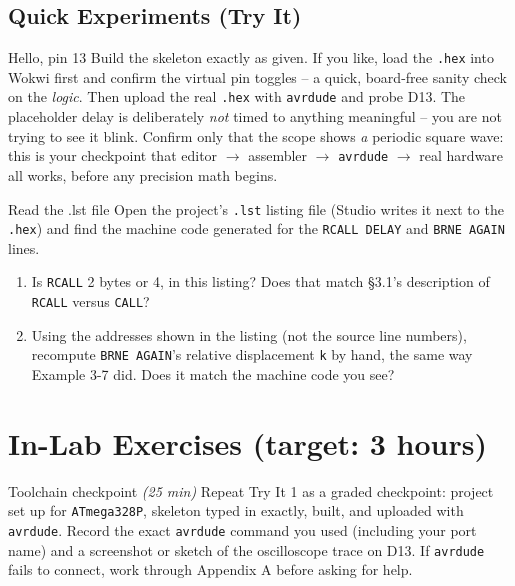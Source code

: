 \documentclass[11pt]{article}
\begin{document}
\subsection*{Quick Experiments (Try It)}

\begin{tryit}{Hello, pin 13}
Build the skeleton exactly as given. If you like, load the \texttt{.hex} into Wokwi
first and confirm the virtual pin toggles -- a quick, board-free sanity check on the
\emph{logic}. Then upload the real \texttt{.hex} with \texttt{avrdude} and probe D13.
The placeholder delay is deliberately \emph{not} timed to anything meaningful --
you are not trying to see it blink. Confirm only that the scope shows \emph{a}
periodic square wave: this is your checkpoint that editor $\to$ assembler $\to$
\texttt{avrdude} $\to$ real hardware all works, before any precision math begins.
\end{tryit}

\begin{tryit}{Read the .lst file}
Open the project's \texttt{.lst} listing file (Studio writes it next to the
\texttt{.hex}) and find the machine code generated for the \texttt{RCALL DELAY} and
\texttt{BRNE AGAIN} lines.
\begin{enumerate}[nosep,leftmargin=*]
  \item Is \texttt{RCALL} 2 bytes or 4, in this listing? Does that match \S3.1's
        description of \texttt{RCALL} versus \texttt{CALL}?
  \item Using the addresses shown in the listing (not the source line numbers),
        recompute \texttt{BRNE AGAIN}'s relative displacement \texttt{k} by hand, the
        same way Example 3-7 did. Does it match the machine code you see?
\end{enumerate}
\end{tryit}

\section*{In-Lab Exercises (target: 3 hours)}

\begin{labexercise}{Toolchain checkpoint \hfill {\small \itshape (25 min)}}
Repeat Try It 1 as a graded checkpoint: project set up for \texttt{ATmega328P},
skeleton typed in exactly, built, and uploaded with \texttt{avrdude}. Record the
exact \texttt{avrdude} command you used (including your port name) and a screenshot
or sketch of the oscilloscope trace on D13. If \texttt{avrdude} fails to connect,
work through Appendix A before asking for help.
\end{labexercise}
\end{document}
